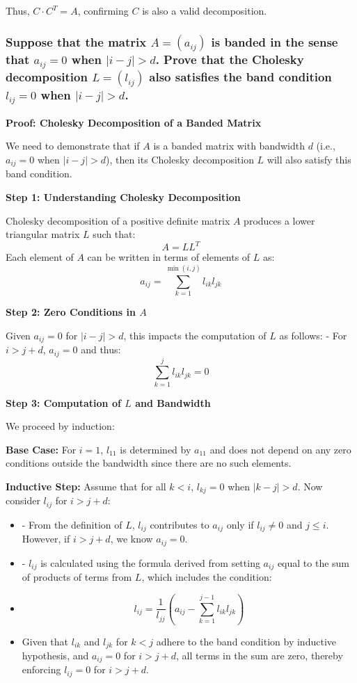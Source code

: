 \documentclass{article}
\begin{document}
Thus, \(C \cdot C^T = A\), confirming \(C\) is also a valid decomposition.

\subsubsection*{Suppose that the matrix \( A = (a_{ij}) \) is banded in the sense that \( a_{ij} = 0 \) when \( |i - j| > d \). Prove that the Cholesky decomposition \( L = (l_{ij}) \) also satisfies the band condition \( l_{ij} = 0 \) when \( |i - j| > d \).}

\textbf{Proof: Cholesky Decomposition of a Banded Matrix}

We need to demonstrate that if \(A\) is a banded matrix with bandwidth \(d\) (i.e., \(a_{ij} = 0\) when \(|i - j| > d\)), then its Cholesky decomposition \(L\) will also satisfy this band condition.

\textbf{Step 1: Understanding Cholesky Decomposition}

Cholesky decomposition of a positive definite matrix \(A\) produces a lower triangular matrix \(L\) such that:
\[ A = LL^T \]
Each element of \(A\) can be written in terms of elements of \(L\) as:
\[ a_{ij} = \sum_{k=1}^{\min(i,j)} l_{ik}l_{jk} \]

\textbf{Step 2: Zero Conditions in \(A\)}

Given \(a_{ij} = 0\) for \(|i - j| > d\), this impacts the computation of \(L\) as follows:
- For \(i > j + d\), \(a_{ij} = 0\) and thus:
\[ \sum_{k=1}^j l_{ik}l_{jk} = 0 \]

\textbf{Step 3: Computation of \(L\) and Bandwidth}

We proceed by induction:

\textbf{Base Case:} For \(i = 1\), \(l_{11}\) is determined by \(a_{11}\) and does not depend on any zero conditions outside the bandwidth since there are no such elements.

\textbf{Inductive Step: }Assume that for all \(k < i\), \(l_{kj} = 0\) when \(|k - j| > d\). Now consider \(l_{ij}\) for \(i > j + d\):
  \begin{itemize}
      \item - From the definition of \(L\), \(l_{ij}\) contributes to \(a_{ij}\) only if \(l_{ij} \neq 0\) and \(j \leq i\). However, if \(i > j + d\), we know \(a_{ij} = 0\).
      \item - \(l_{ij}\) is calculated using the formula derived from setting \(a_{ij}\) equal to the sum of products of terms from \(L\), which includes the condition:
      \item \[ l_{ij} = \frac{1}{l_{jj}} \left(a_{ij} - \sum_{k=1}^{j-1} l_{ik}l_{jk}\right) \]
      \item Given that \(l_{ik}\) and \(l_{jk}\) for \(k < j\) adhere to the band condition by inductive hypothesis, and \(a_{ij} = 0\) for \(i > j + d\), all terms in the sum are zero, thereby enforcing \(l_{ij} = 0\) for \(i > j + d\).
  \end{itemize}
\end{document}
